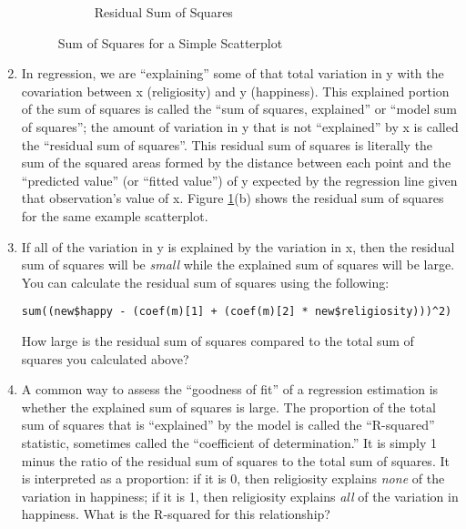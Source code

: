 \documentclass[a4paper,12pt]{article}
\begin{document}
\begin{enumerate}
\begin{figure}
\begin{subfigure}[t]{0.49\columnwidth}
\caption{Residual Sum of Squares}
\end{subfigure}
\caption{Sum of Squares for a Simple Scatterplot}\label{fig:tss}
\end{figure}

\item In regression, we are ``explaining'' some of that total variation in y with the covariation between x (religiosity) and y (happiness). This explained portion of the sum of squares is called the ``sum of squares, explained'' or ``model sum of squares''; the amount of variation in y that is not ``explained'' by x is called the ``residual sum of squares''. This residual sum of squares is literally the sum of the squared areas formed by the distance between each point and the ``predicted value'' (or ``fitted value'') of y expected by the regression line given that observation's value of x. Figure \ref{fig:tss}(b) shows the residual sum of squares for the same example scatterplot.

\item If all of the variation in y is explained by the variation in x, then the residual sum of squares will be \textit{small} while the explained sum of squares will be large. You can calculate the residual sum of squares using the following:

\begin{verbatim}
sum((new$happy - (coef(m)[1] + (coef(m)[2] * new$religiosity)))^2)
\end{verbatim}

\noindent How large is the residual sum of squares compared to the total sum of squares you calculated above?

\item A common way to assess the ``goodness of fit'' of a regression estimation is whether the explained sum of squares is large. The proportion of the total sum of squares that is ``explained'' by the model is called the ``R-squared'' statistic, sometimes called the ``coefficient of determination.'' It is simply 1 minus the ratio of the residual sum of squares to the total sum of squares. It is interpreted as a proportion: if it is 0, then religiosity explains \textit{none} of the variation in happiness; if it is 1, then religiosity explains \textit{all} of the variation in happiness. What is the R-squared for this relationship?


\end{enumerate}
\end{document}

